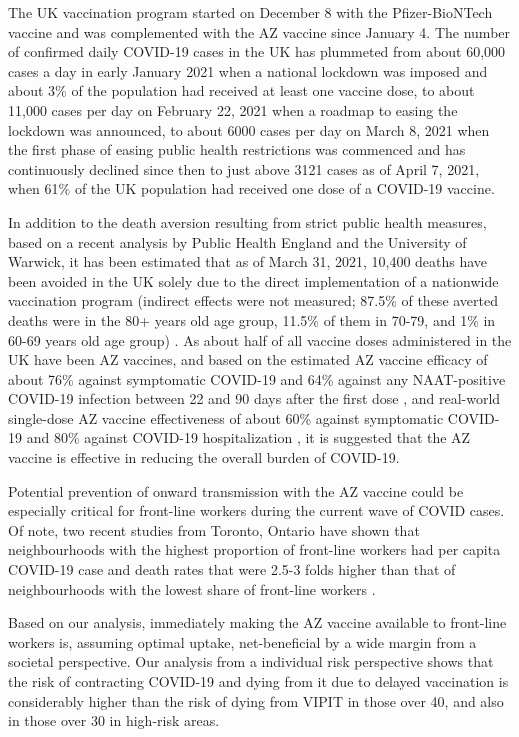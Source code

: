 \documentclass[]{interact}
\theoremstyle{plain}%
\theoremstyle{definition}
\theoremstyle{remark}
\begin{document}
The UK vaccination program started on December 8 with the
Pfizer-BioNTech vaccine and was complemented with the AZ vaccine since
January 4. The number of confirmed daily COVID-19 cases in the UK has
plummeted from about 60,000 cases a day in early January 2021 when a
national lockdown was imposed and about 3\% of the population had
received at least one vaccine dose, to about 11,000 cases per day on
February 22, 2021 when a roadmap to easing the lockdown was announced,
to about 6000 cases per day on March 8, 2021 when the first phase of
easing public health restrictions was commenced
\citep{bbc_lockdown_2021} and has continuously declined since then to
just above 3121 cases as of April 7, 2021, when 61\% of the UK
population had received one dose of a COVID-19 vaccine.

In addition to the death aversion resulting from strict public health
measures, based on a recent analysis by Public Health England and the
University of Warwick, it has been estimated that as of March 31, 2021,
10,400 deaths have been avoided in the UK solely due to the direct
implementation of a nationwide vaccination program (indirect effects
were not measured; 87.5\% of these averted deaths were in the 80+ years
old age group, 11.5\% of them in 70-79, and 1\% in 60-69 years old age
group) \citep{public_health_england_impact_2021}. As about half of all
vaccine doses administered in the UK have been AZ vaccines, and based on
the estimated AZ vaccine efficacy of about 76\% against symptomatic
COVID-19 and 64\% against any NAAT-positive COVID-19 infection between
22 and 90 days after the first dose \citep{voysey_single-dose_2021}, and
real-world single-dose AZ vaccine effectiveness of about 60\% against
symptomatic COVID-19 and 80\% against COVID-19 hospitalization
\citep{public_health_england_1public_2021}, it is suggested that the AZ
vaccine is effective in reducing the overall burden of COVID-19.

Potential prevention of onward transmission with the AZ vaccine could be
especially critical for front-line workers during the current wave of
COVID cases. Of note, two recent studies from Toronto, Ontario have
shown that neighbourhoods with the highest proportion of front-line
workers had per capita COVID-19 case and death rates that were 2.5-3
folds higher than that of neighbourhoods with the lowest share of
front-line workers
\citep[\citet{rao_disproportionate_2021}]{chagla_characterizing_2021}.

Based on our analysis, immediately making the AZ vaccine available to
front-line workers is, assuming optimal uptake, net-beneficial by a wide
margin from a societal perspective. Our analysis from a individual risk
perspective shows that the risk of contracting COVID-19 and dying from
it due to delayed vaccination is considerably higher than the risk of
dying from VIPIT in those over 40, and also in those over 30 in
high-risk areas.
\end{document}
